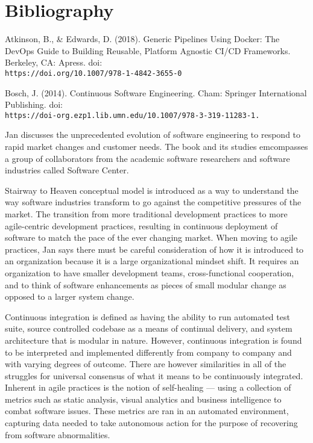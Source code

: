 \documentclass[11pt,a4paper]{article}
\begin{document}
\section{Bibliography}
\begin{thebibliography}{6}
	 Atkinson, B., \& Edwards, D. (2018). Generic Pipelines Using Docker: The 		DevOps Guide to Building Reusable, Platform Agnostic CI/CD Frameworks. Berkeley, CA: Apress. doi:\\\texttt{https://doi.org/10.1007/978-1-4842-3655-0}
	
	 Bosch, J. (2014). Continuous Software Engineering. Cham: Springer International Publishing. doi:\\\texttt{https://doi-org.ezp1.lib.umn.edu/10.1007/978-3-319-11283-1.}
	\begin{adjustwidth}{1cm}{}
		Jan discusses the unprecedented evolution of software engineering to respond to rapid
		market changes and customer needs. The book and its studies emcompasses a group of
		collaborators from the academic software researchers and software industries called
		Software Center.
		
		Stairway to Heaven conceptual model is introduced as a way to understand the way
		software industries transform to go against the competitive pressures of the market.
		The transition from more traditional development practices to more agile-centric
		development practices, resulting in continuous deployment of software to match the
		pace of the ever changing market. When moving to agile practices, Jan says there must
		be careful consideration of how it is introduced to an organization because it is a large
		organizational mindset shift. It requires an organization to have smaller development
		teams, cross-functional cooperation, and to think of software enhancements as pieces
		of small modular change as opposed to a larger system change.
		
		Continuous integration is defined as having the ability to run automated test suite,
		source controlled codebase as a means of continual delivery, and system architecture
		that is modular in nature. However, continuous integration is found to be interpreted
		and implemented differently from company to company and with varying degrees of
		outcome. There are however similarities in all of the struggles for universal consensus of
		what it means to be continuously integrated. Inherent in agile practices is the notion of
		self-healing — using a collection of metrics such as static analysis, visual analytics and
		business intelligence to combat software issues. These metrics are ran in an automated
		environment, capturing data needed to take autonomous action for the purpose of
		recovering from software abnormalities.
		

\end{adjustwidth}
\end{thebibliography}
\end{document}
